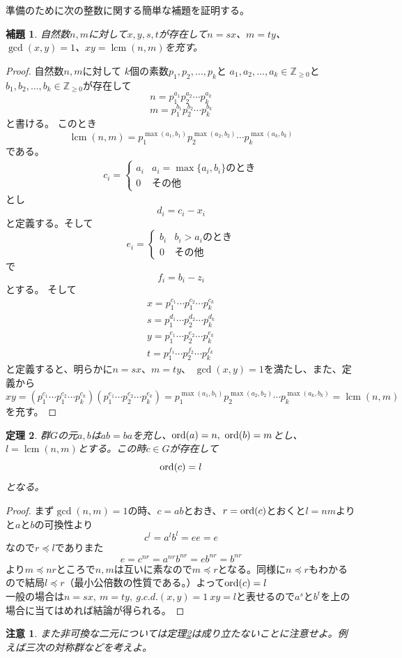 \documentclass{jsarticle}
\newtheorem{thm}{定理}
\newtheorem{lem}[thm]{補題}
\newtheorem*{cau}{注意}
\newcommand{\zz}{\mathbb{Z}}
\newcommand{\ord}{\text{{\rm ord}}}
\DeclareMathOperator{\lcm}{lcm}
\begin{document}
準備のために次の整数に関する簡単な補題を証明する。
\begin{lem}
自然数$n,m$に対して$x,y,s,t$が存在して$n=sx$、$m=ty$、
$\gcd(x,y)=1$、$xy=\lcm(n,m)$を充す。
\end{lem}
\begin{proof}
自然数$n,m$に対して
$k$個の素数$p_1,p_2,\dots, p_k$と
$a_1, a_2, \dots, a_k\in \zz_{\ge0}$と
$b_1, b_2, \dots, b_k \in \zz_{\ge 0}$が存在して
\[
n=p_1^{a_1}p_{2}^{a_2}\cdots p_{k}^{a_k}
\]
\[
m=p_1^{b_1}p_{2}^{b_2}\cdots p_{k}^{b_k}
\]
と書ける。
このとき
\[
\lcm(n,m)=p_1^{\max(a_1,b_1)}p_{2}^{\max(a_2,b_2)}\cdots p_{k}^{\max(a_k,b_k)}
\]
である。
\begin{align*}
c_i=
	\begin{cases}
	a_i & \text{$a_i=\max\{a_i,b_i\}$のとき}\\
	0 & \text{$その他$}
	\end{cases}
\end{align*}
とし
\[
d_i=c_i-x_i
\]
と定義する。そして
\[
e_i=
	\begin{cases}
	b_i & \text{$b_i>a_i$のとき}\\
	0 & \text{$その他$}
	\end{cases}
\]
で
\[
f_i=b_i-z_i
\]
とする。
そして
\begin{align*}
x=p_1^{c_1}\cdots p_1^{c_2}\cdots p_k^{c_k}\\
s=p_1^{d_1}\cdots p_2^{d_2}\cdots p_k^{d_k}\\
y=p_1^{e_1}\cdots p_2^{e_2}\cdots p_k^{e_k}\\
t=p_1^{f_1}\cdots p_2^{f_2}\cdots p_k^{f_k}
\end{align*}
と定義すると、明らかに$n=sx$、$m=ty$、
$\gcd(x,y)=1$を満たし、また、定義から
\[
xy=(p_1^{c_1}\cdots p_1^{c_2}\cdots p_k^{c_k})(p_1^{e_1}\cdots p_2^{e_2}\cdots p_k^{e_k})=p_1^{\max(a_1,b_1)}p_{2}^{\max(a_2,b_2)}\cdots p_{k}^{\max(a_k,b_k)}=\lcm(n,m)
\]
を充す。
\end{proof}

\begin{thm}\label{aaa}
群$G$の元$a,b$は$ab=ba$を充し、$\ord(a)=n,\ \ord(b)=m$とし、$l=\lcm (n,m)$とする。この時$c\in G$が存在して 
\[
\ord(c)=l
\]
となる。
\end{thm}
\begin{proof}
まず$\gcd(n,m)=1$の時、$c=ab$とおき、$r=\ord(c)$とおくと$l=nm$よりと$a$と$b$の可換性より
\[
c^l=a^lb^l=ee=e
\]
なので$r\preceq l$でありまた
\[
e=c^{nr}=a^{nr}b^{nr}=eb^{nr}=b^{nr}
\]
より$m\preceq nr$ところで$n,m$は互いに素なので$m\preceq r$となる。同様に$n\preceq r$もわかるので結局$l\preceq r$（最小公倍数の性質である。）よって$\ord(c)=l$\\ 
一般の場合は$n=sx,\ m=ty,\ g.c.d.(x,y)=1\ xy=l$と表せるので$a^s$と$b^t$を上の場合に当てはめれば結論が得られる。
\end{proof}
\begin{cau}
また非可換な二元については定理\ref{aaa}は成り立たないことに注意せよ。例えば三次の対称群などを考えよ。
\end{cau}
\end{document}

